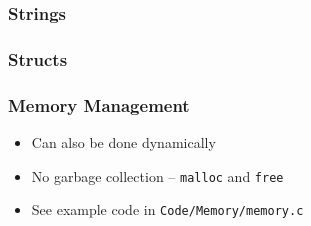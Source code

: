 \documentclass{beamer}
\begin{document}
\begin{frame}
    \frametitle{Strings}
    \begin{figure}
        
    \end{figure}
\end{frame}

\begin{frame}
    \frametitle{Structs}
    \begin{figure}
        
    \end{figure}
\end{frame}

\begin{frame}
    \frametitle{Memory Management}
    \begin{itemize}[<+->]
        \item Can also be done dynamically
        \item No garbage collection -- \texttt{malloc} and \texttt{free}
        \item See example code in \texttt{Code/Memory/memory.c}
    \end{itemize}
\end{frame}
\end{document}
